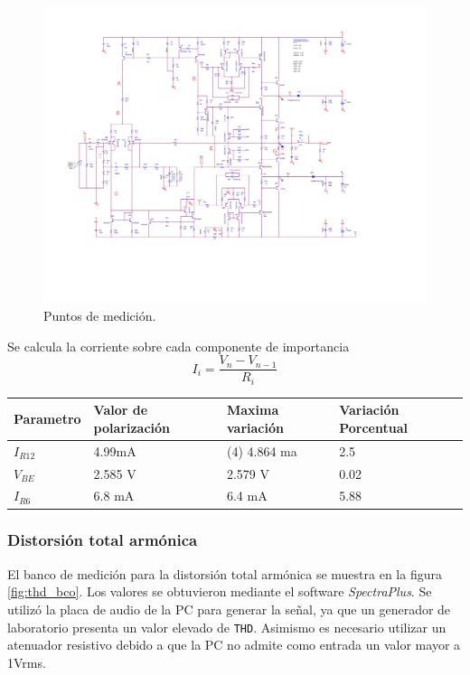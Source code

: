 		\begin{figure}[H]
			\centering
			\includegraphics[scale=0.6]{./Figuras/esquema_puntos.pdf}
			\caption{Puntos de medición.}
			\label{fig:esq_med}
		\end{figure}
		\begin{table}
			
		Se calcula la corriente sobre cada componente de importancia
		\begin{equation*}
		I_i = \frac{V_n - V_{n-1}}{R_i} 
		\end{equation*}

		\begin{tabular}{|l|l|l|l|}
		\hline
		Parametro & Valor de polarización & Maxima variación & Variación Porcentual \\ \hline
		$I_{R12}$      & 4.99mA       		  & (4) 4.864 ma  				&  2.5 \\ \hline
		$V_{BE}$      & 2.585 V      		  &  2.579 V				& 0.02  \\ \hline
		$I_{R6}$      & 6.8 mA      		  &  6.4 mA		    & 5.88  \\ \hline
		\end{tabular}
		\label{tab.valores}
		\end{table}
		\subsubsection{Distorsión total armónica}

		El banco de medición para la distorsión total armónica se muestra en la figura \ref{fig:thd_bco}. Los valores se obtuvieron mediante el software \textit{SpectraPlus}. Se utilizó la placa de audio de la PC para generar la señal, ya que un generador de laboratorio presenta un valor elevado de \texttt{THD}. Asimismo es necesario utilizar un atenuador resistivo debido a que la PC no admite como entrada un valor mayor a 1Vrms. 

